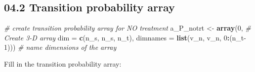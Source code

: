 \documentclass[
]{article}
\newenvironment{Shaded}{\begin{snugshade}}{\end{snugshade}}
\newcommand{\CommentTok}[1]{\textcolor[rgb]{0.56,0.35,0.01}{\textit{#1}}}
\newcommand{\DataTypeTok}[1]{\textcolor[rgb]{0.13,0.29,0.53}{#1}}
\newcommand{\DecValTok}[1]{\textcolor[rgb]{0.00,0.00,0.81}{#1}}
\newcommand{\KeywordTok}[1]{\textcolor[rgb]{0.13,0.29,0.53}{\textbf{#1}}}
\newcommand{\NormalTok}[1]{#1}
\newcommand{\OperatorTok}[1]{\textcolor[rgb]{0.81,0.36,0.00}{\textbf{#1}}}
\newcommand{\StringTok}[1]{\textcolor[rgb]{0.31,0.60,0.02}{#1}}
\begin{document}
\hypertarget{transition-probability-array}{%
\subsection{04.2 Transition probability
array}\label{transition-probability-array}}

\begin{Shaded}
\begin{Highlighting}[]
\CommentTok{# create transition probability array for NO treatment}
\NormalTok{a_P_notrt <-}\StringTok{ }\KeywordTok{array}\NormalTok{(}\DecValTok{0}\NormalTok{,                                    }\CommentTok{# Create 3-D array}
                   \DataTypeTok{dim      =} \KeywordTok{c}\NormalTok{(n_s, n_s, n_t),}
                   \DataTypeTok{dimnames =} \KeywordTok{list}\NormalTok{(v_n, v_n, }\DecValTok{0}\OperatorTok{:}\NormalTok{(n_t}\DecValTok{-1}\NormalTok{))) }\CommentTok{# name dimensions of the array}
\end{Highlighting}
\end{Shaded}

Fill in the transition probability array:
\end{document}
